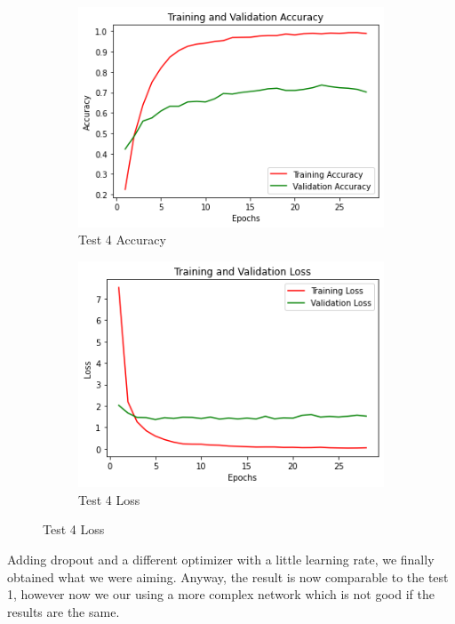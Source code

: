 \begin{figure}[H]
	\begin{subfigure}{0.5\textwidth}
		\includegraphics[width=0.9\linewidth]{img/vgg16/vgg16ft1dropacc.png} 
		\caption{Test 4 Accuracy}
		\label{fig:vgg16ft1dropacc}
	\end{subfigure}
	\begin{subfigure}{0.5\textwidth}
		\includegraphics[width=0.9\linewidth]{img/vgg16/vgg16ft1droploss.png}
		\caption{Test 4 Loss}
		\label{fig:vgg16ft1droploss}
	\end{subfigure}
\end{figure}


\noindent Adding dropout and a different optimizer with a little learning rate, we finally obtained what we were aiming. Anyway, the result is now comparable to the test 1, however now we our using a more complex network which is not good if the results are the same.

